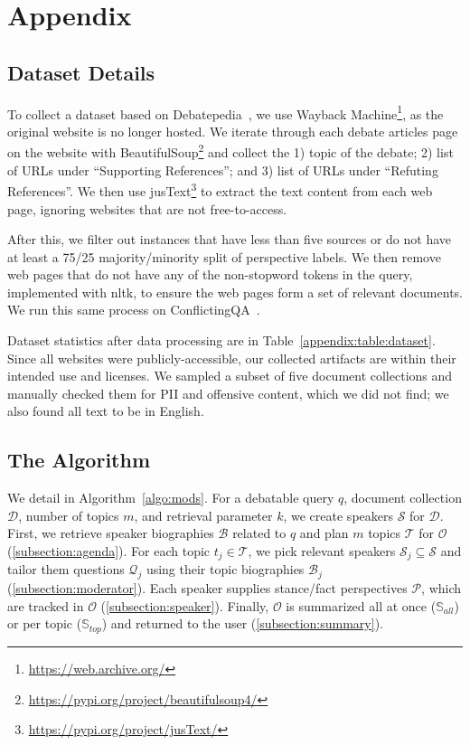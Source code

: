 
\section{Appendix} \label{appendix}

\subsection{Dataset Details} \label{appendix:data}

To collect a dataset based on Debatepedia~\cite{gottopati2013learning}, we use Wayback Machine\footnote{\url{https://web.archive.org/}}, as the original website is no longer hosted.
We iterate through each debate articles page on the website with BeautifulSoup\footnote{\url{https://pypi.org/project/beautifulsoup4/}} and collect the 1) topic of the debate; 2) list of URLs under ``Supporting References''; and 3) list of URLs under ``Refuting References''.
We then use jusText\footnote{\url{https://pypi.org/project/jusText/}} to extract the text content from each web page, ignoring websites that are not free-to-access.

After this, we filter out instances that have less than five sources or do not have at least a 75/25 majority/minority split of perspective labels.
We then remove web pages that do not have any of the non-stopword tokens in the query, implemented with nltk, to ensure the web pages form a set of relevant documents.
We run this same process on ConflictingQA~\cite{wan2024evidence}.

Dataset statistics after data processing are in Table~\ref{appendix:table:dataset}.
Since all websites were publicly-accessible, our collected artifacts are within their intended use and licenses.
We sampled a subset of five document collections and manually checked them for PII and offensive content, which we did not find; we also found all text to be in English.

\subsection{The \model Algorithm} \label{subsection:model}

We detail \model in Algorithm~\ref{algo:mods}. For a debatable query $q$, document collection $\mathcal{D}$, number of topics $m$, and retrieval parameter $k$, we create speakers $\mathcal{S}$ for $\mathcal{D}$.
First, we retrieve speaker biographies $\mathcal{B}$ related to $q$ and plan $m$ topics $\mathcal{T}$ for $\mathcal{O}$ (\cref{subsection:agenda}). For each topic $t_j \in \mathcal{T}$, we pick relevant speakers $\mathcal{S}_j \subseteq \mathcal{S}$ and tailor them questions $\mathcal{Q}_j$ using their topic biographies $\mathcal{B}_j$ (\cref{subsection:moderator}). Each speaker supplies stance/fact perspectives $\mathcal{P}$, which are tracked in $\mathcal{O}$ (\cref{subsection:speaker}).
Finally, $\mathcal{O}$ is summarized all at once ($\mathbb{S}_{all}$) or per topic ($\mathbb{S}_{top}$) and returned to the user (\cref{subsection:summary}).


